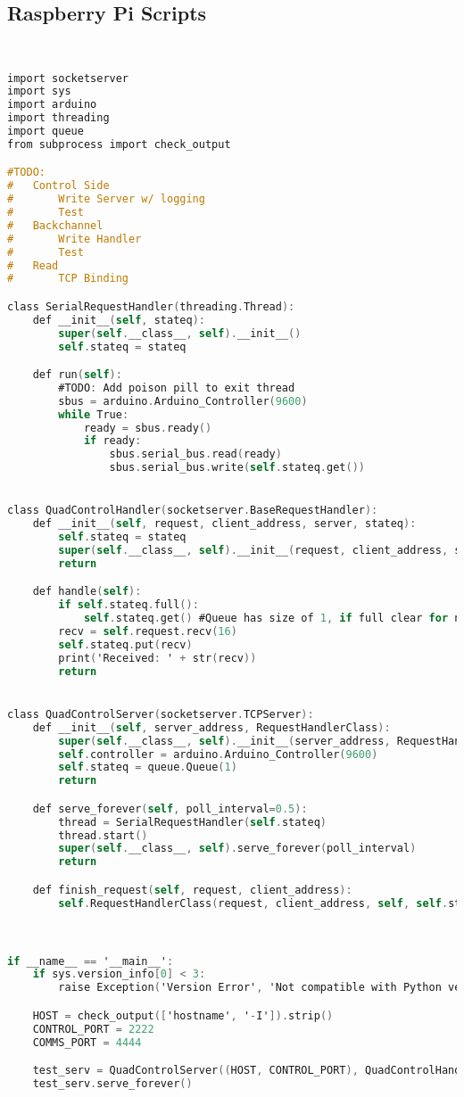 \subsection{Raspberry Pi Scripts}
\label{appendix:server}
\lstset{basicstyle=\tiny}
\begin{lstlisting}[language=C,caption={Server.py Raspberry Pi Communication Server},label={lst:server.py}]


import socketserver
import sys
import arduino
import threading
import queue
from subprocess import check_output

#TODO:
#   Control Side
#       Write Server w/ logging
#       Test
#   Backchannel
#       Write Handler
#       Test
#   Read
#       TCP Binding

class SerialRequestHandler(threading.Thread):
    def __init__(self, stateq):
        super(self.__class__, self).__init__()
        self.stateq = stateq

    def run(self):
        #TODO: Add poison pill to exit thread
        sbus = arduino.Arduino_Controller(9600)
        while True:
            ready = sbus.ready()
            if ready:
                sbus.serial_bus.read(ready)
                sbus.serial_bus.write(self.stateq.get())


class QuadControlHandler(socketserver.BaseRequestHandler):
    def __init__(self, request, client_address, server, stateq):
        self.stateq = stateq
        super(self.__class__, self).__init__(request, client_address, server)
        return

    def handle(self):
        if self.stateq.full():
            self.stateq.get() #Queue has size of 1, if full clear for new state
        recv = self.request.recv(16)
        self.stateq.put(recv)
        print('Received: ' + str(recv))
        return


class QuadControlServer(socketserver.TCPServer):
    def __init__(self, server_address, RequestHandlerClass):
        super(self.__class__, self).__init__(server_address, RequestHandlerClass)
        self.controller = arduino.Arduino_Controller(9600)
        self.stateq = queue.Queue(1)
        return

    def serve_forever(self, poll_interval=0.5):
        thread = SerialRequestHandler(self.stateq)
        thread.start()
        super(self.__class__, self).serve_forever(poll_interval)
        return

    def finish_request(self, request, client_address):
        self.RequestHandlerClass(request, client_address, self, self.stateq)



if __name__ == '__main__':
    if sys.version_info[0] < 3:
        raise Exception('Version Error', 'Not compatible with Python version 2')

    HOST = check_output(['hostname', '-I']).strip()
    CONTROL_PORT = 2222
    COMMS_PORT = 4444

    test_serv = QuadControlServer((HOST, CONTROL_PORT), QuadControlHandler)
    test_serv.serve_forever()

\end{lstlisting}

